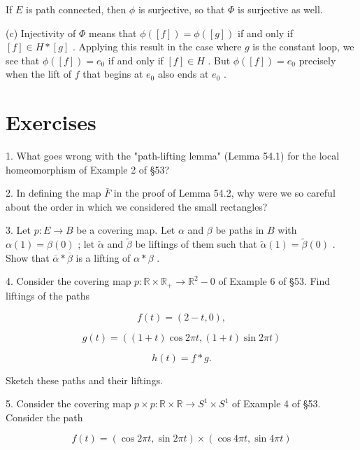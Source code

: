 \documentclass[10pt]{article}
\begin{document}
If \(E\) is path connected, then \(\phi\) is surjective, so that \(\Phi\) is surjective as well.

(c) Injectivity of \(\Phi\) means that \(\phi \left( \left\lbrack  f\right\rbrack  \right)  = \phi \left( \left\lbrack  g\right\rbrack  \right)\) if and only if \(\left\lbrack  f\right\rbrack   \in  H * \left\lbrack  g\right\rbrack\) . Applying this result in the case where \(g\) is the constant loop, we see that \(\phi \left( \left\lbrack  f\right\rbrack  \right)  = {e}_{0}\) if and only if \(\left\lbrack  f\right\rbrack   \in  H\) . But \(\phi \left( \left\lbrack  f\right\rbrack  \right)  = {e}_{0}\) precisely when the lift of \(f\) that begins at \({e}_{0}\) also ends at \({e}_{0}\) .

\section*{Exercises}

1. What goes wrong with the "path-lifting lemma" (Lemma 54.1) for the local homeomorphism of Example 2 of §53?

2. In defining the map \(\bar{F}\) in the proof of Lemma 54.2, why were we so careful about the order in which we considered the small rectangles?

3. Let \(p : E \rightarrow  B\) be a covering map. Let \(\alpha\) and \(\beta\) be paths in \(B\) with \(\alpha \left( 1\right)  = \beta \left( 0\right)\) ; let \(\widetilde{\alpha }\) and \(\widetilde{\beta }\) be liftings of them such that \(\widetilde{\alpha }\left( 1\right)  = \widetilde{\beta }\left( 0\right)\) . Show that \(\overline{\alpha } * \overline{\beta }\) is a lifting of \(\alpha  * \beta\) .

4. Consider the covering map \(p : \mathbb{R} \times  {\mathbb{R}}_{ + } \rightarrow  {\mathbb{R}}^{2} - 0\) of Example 6 of §53. Find liftings of the paths

\[
f\left( t\right)  = \left( {2 - t,0}\right) ,
\]

\[
g\left( t\right)  = \left( {\left( {1 + t}\right) \cos {2\pi t},\left( {1 + t}\right) \sin {2\pi t}}\right)
\]

\[
h\left( t\right)  = f * g.
\]

Sketch these paths and their liftings.

5. Consider the covering map \(p \times  p : \mathbb{R} \times  \mathbb{R} \rightarrow  {S}^{1} \times  {S}^{1}\) of Example 4 of §53. Consider the path

\[
f\left( t\right)  = \left( {\cos {2\pi t},\sin {2\pi t}}\right)  \times  \left( {\cos {4\pi t},\sin {4\pi t}}\right)
\]
\end{document}
